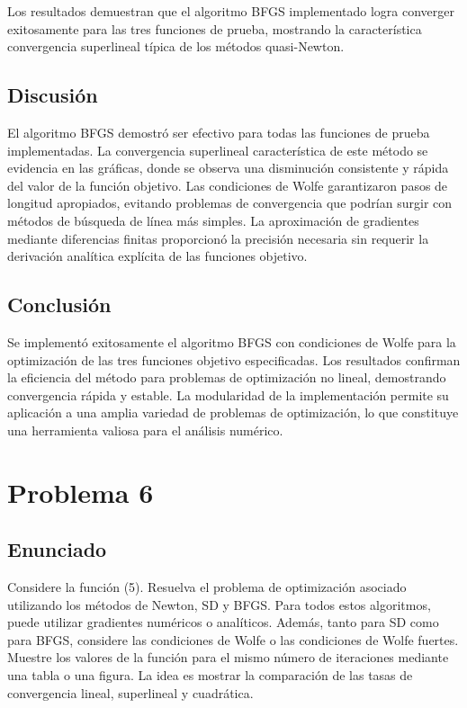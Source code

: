 \documentclass{article}
\begin{document}
Los resultados demuestran que el algoritmo BFGS implementado logra converger exitosamente para las tres funciones de prueba, mostrando la característica convergencia superlineal típica de los métodos quasi-Newton.

\subsection{Discusión}

El algoritmo BFGS demostró ser efectivo para todas las funciones de prueba implementadas. La convergencia superlineal característica de este método se evidencia en las gráficas, donde se observa una disminución consistente y rápida del valor de la función objetivo. Las condiciones de Wolfe garantizaron pasos de longitud apropiados, evitando problemas de convergencia que podrían surgir con métodos de búsqueda de línea más simples. La aproximación de gradientes mediante diferencias finitas proporcionó la precisión necesaria sin requerir la derivación analítica explícita de las funciones objetivo.

\subsection{Conclusión}

Se implementó exitosamente el algoritmo BFGS con condiciones de Wolfe para la optimización de las tres funciones objetivo especificadas. Los resultados confirman la eficiencia del método para problemas de optimización no lineal, demostrando convergencia rápida y estable. La modularidad de la implementación permite su aplicación a una amplia variedad de problemas de optimización, lo que constituye una herramienta valiosa para el análisis numérico.

\section{Problema 6}

\subsection{Enunciado}

Considere la función (5). Resuelva el problema de optimización asociado utilizando los métodos de Newton, SD y BFGS. Para todos estos algoritmos, puede utilizar gradientes numéricos o analíticos. Además, tanto para SD como para BFGS, considere las condiciones de Wolfe o las condiciones de Wolfe fuertes. Muestre los valores de la función para el mismo número de iteraciones mediante una tabla o una figura. La idea es mostrar la comparación de las tasas de convergencia lineal, superlineal y cuadrática.
\end{document}
